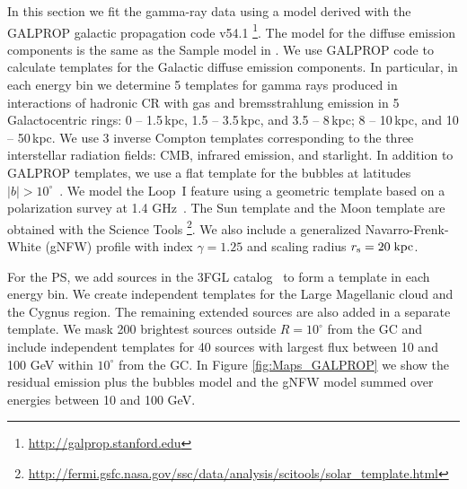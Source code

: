 In this section we fit the gamma-ray data using a model derived with the GALPROP
galactic propagation code v54.1
\citep{Moskalenko:1997gh, Strong:1998fr, Strong:2004de, Ptuskin:2005ax, 2007ARNPS..57..285S, Porter:2008ve,Vladimirov:2010aq}\footnote{\url{http://galprop.stanford.edu}}. 
The model for the diffuse emission components is the same as the Sample model in \cite{2017ApJ...840...43A}.
We use GALPROP code to calculate templates for the Galactic diffuse emission components.
In particular, in each energy bin we determine 5 templates for gamma rays produced in 
interactions of hadronic CR with gas and bremsstrahlung emission in 5 Galactocentric rings: 
0 -- 1.5\,kpc, 1.5 -- 3.5\,kpc, and 3.5 -- 8\,kpc; 8 -- 10\,kpc, and 10 -- 50\,kpc. 
We use 3 inverse Compton templates corresponding to the three interstellar radiation fields: CMB, 
infrared emission, and starlight.
In addition to GALPROP templates, we use a flat template for the \Fermi bubbles at latitudes $|b| > 10^\circ$~\citep{2014ApJ...793...64A}. 
We model the Loop~I feature using a geometric template \citep[e.g., Figure 2 of][]{2014ApJ...793...64A}
based on a polarization survey at 1.4 GHz~\citep{Wolleben:2007pq}.
The Sun template \citep{2007Ap&SS.309..359O, 2006ApJ...652L..65M, 2008A&A...480..847O, 2013arXiv1307.0197J} and the Moon template 
are obtained with the \Fermi Science Tools%
\footnote{\url{http://fermi.gsfc.nasa.gov/ssc/data/analysis/scitools/solar_template.html}}.
We also include a generalized Navarro-Frenk-White (gNFW) profile with index $\gamma = 1.25$ and scaling radius $r_{\rm s} = 20\;{\rm kpc}$.


For the PS, we add sources in the 3FGL catalog~\citep{2015ApJS..218...23A} to form a template
in each energy bin.
We create independent templates for the Large Magellanic cloud and the Cygnus region.
The remaining extended sources are also added in a separate template.
We mask 200 brightest sources outside $R = 10^\circ$ from the GC and include independent templates
for 40 sources with largest flux between 10 and 100 GeV within $10^\circ$ from the GC.
In Figure \ref{fig:Maps_GALPROP} we show the residual emission plus the \Fermi bubbles model and the gNFW model summed over energies between 10 and 100 GeV.



